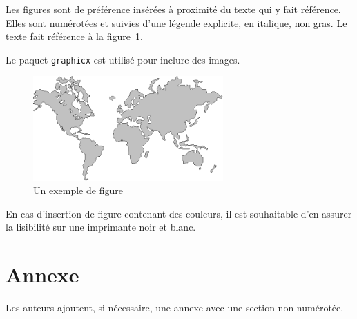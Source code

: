 \documentclass[city=Montpellier,year=2013]{jres}
\begin{document}
Les figures sont de préférence insérées à proximité du texte qui y
fait référence. Elles sont numérotées et suivies d'une légende
explicite, en italique, non gras. Le texte fait référence à la
figure~\ref{fig-exemple}.

Le paquet \texttt{graphicx} est utilisé pour inclure des images.

\begin{figure}
    \centerline{\includegraphics[height=4cm]{figure}}
    \caption{Un exemple de figure}
    \label{fig-exemple}
\end{figure}

En cas d'insertion de figure contenant des couleurs, il est souhaitable
d'en assurer la lisibilité sur une imprimante noir et blanc.

\section*{Annexe}

Les auteurs ajoutent, si nécessaire, une annexe avec une section non numérotée.

\nocite{*}

\end{document}
